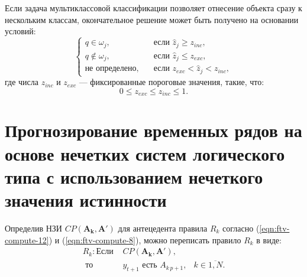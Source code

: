 Если задача мультиклассовой классификации позволяет отнесение объекта сразу к нескольким классам, окончательное решение может быть получено на основании условий:
\begin{equation*}
	\begin{cases}
		q \in \omega_j, \quad&\text{если }\hat{z}_j \geq z_{inc},\\
		q \notin \omega_j, \quad&\text{если }\hat{z}_j \leq z_{exc},\\
		\text{не определено}, \quad&\text{если }z_{exc} < \hat{z}_j < z_{inc},
	\end{cases}
\end{equation*}
где числа $z_{inc}$ и $z_{exc}$ --- фиксированные пороговые значения, такие, что:
\[
	0 \leq z_{exc} \leq z_{inc} \leq 1.
\]




\section{Прогнозирование временных рядов на основе нечетких систем логического типа с использованием нечеткого значения истинности}

Определив НЗИ $CP(\mathbf{A_{k}, \mathbf{A'}})$ для антецедента правила $R_k$ согласно (\ref{eqn:ftv-compute-12}) и (\ref{eqn:ftv-compute-8}), можно переписать правило $R_k$ в виде:
\begin{align*}
	R_k: \textrm{Если }&CP(\mathbf{A_{k}, \mathbf{A'}}),&\\
	\textrm{ то }&y_{t+1}\textrm{ есть }A_{k\,p+1},&k\in\overline{1,N}.
\end{align*}


